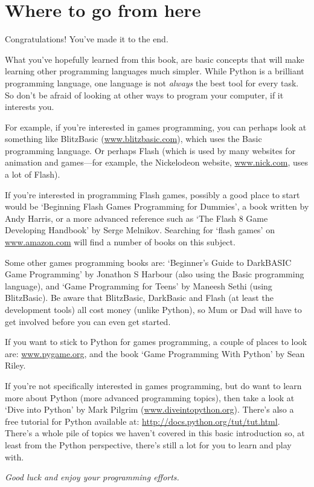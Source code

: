 

\chapter{Where to go from here}

Congratulations! You've made it to the end.
\par
What you've hopefully learned from this book, are basic concepts that will make learning other programming languages much simpler.  While Python is a brilliant programming language, one language is not \emph{always} the best tool for every task.  So don't be afraid of looking at other ways to program your computer, if it interests you.

For example, if you're interested in games programming, you can perhaps look at something like BlitzBasic (\href{http://www.blitzbasic.com}{www.blitzbasic.com}), which uses the Basic programming language. Or perhaps Flash (which is used by many websites for animation and games---for example, the Nickelodeon website, \href{http://www.nick.com}{www.nick.com}, uses a lot of Flash).

If you're interested in programming Flash games, possibly a good place to start would be `Beginning Flash Games Programming for Dummies', a book written by Andy Harris, or a more advanced reference such as `The Flash 8 Game Developing Handbook' by Serge Melnikov.  Searching for `flash games' on \href{http://www.amazon.com}{www.amazon.com} will find a number of books on this subject.

Some other games programming books are: `Beginner's Guide to DarkBASIC Game Programming' by Jonathon S Harbour (also using the Basic programming language), and `Game Programming for Teens' by Maneesh Sethi (using BlitzBasic). Be aware that BlitzBasic, DarkBasic and Flash (at least the development tools) all cost money (unlike Python), so Mum or Dad will have to get involved before you can even get started.

If you want to stick to Python for games programming, a couple of places to look are: \href{http://www.pygame.org}{www.pygame.org}, and the book `Game Programming With Python' by Sean Riley.

If you're not specifically interested in games programming, but do want to learn more about Python (more advanced programming topics), then take a look at `Dive into Python' by Mark Pilgrim (\href{http://www.diveintopython.org}{www.diveintopython.org}).  There's also a free tutorial for Python available at: \href{http://docs.python.org/tut/tut.html}{http://docs.python.org/tut/tut.html}.  There's a whole pile of topics we haven't covered in this basic introduction so, at least from the Python perspective, there's still a lot for you to learn and play with.
\par\par\noindent
\emph{Good luck and enjoy your programming efforts.}

\newpage